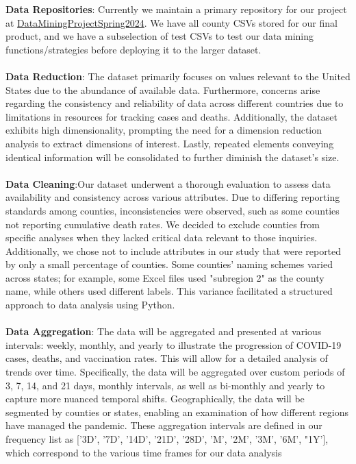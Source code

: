 \documentclass[sigconf,screen,nonacm]{acmart}
\begin{document}
\noindent
\textbf{Data Repositories}: Currently we maintain a primary repository for our project at \href{https://github.com/CCoakley6/DataMiningProjectSpring2024}{DataMiningProjectSpring2024}. We have all county CSVs stored for our final product, and we have a subselection of test CSVs to test our data mining functions/strategies before deploying it to the larger dataset.\\
\\
\textbf{Data Reduction}: The dataset primarily focuses on values relevant to the United States due to the abundance of available data. Furthermore, concerns arise regarding the consistency and reliability of data across different countries due to limitations in resources for tracking cases and deaths. Additionally, the dataset exhibits high dimensionality, prompting the need for a dimension reduction analysis to extract dimensions of interest. Lastly, repeated elements conveying identical information will be consolidated to further diminish the dataset's size.\\
\\
\textbf{Data Cleaning}:Our dataset underwent a thorough evaluation to assess data availability and consistency across various attributes. Due to differing reporting standards among counties, inconsistencies were observed, such as some counties not reporting cumulative death rates. We decided to exclude counties from specific analyses when they lacked critical data relevant to those inquiries. Additionally, we chose not to include attributes in our study that were reported by only a small percentage of counties. Some counties' naming schemes varied across states; for example, some Excel files used "subregion 2" as the county name, while others used different labels. This variance facilitated a structured approach to data analysis using Python. \\
\\
\textbf{Data Aggregation}: The data will be aggregated and presented at various intervals: weekly, monthly, and yearly to illustrate the progression of COVID-19 cases, deaths, and vaccination rates. This will allow for a detailed analysis of trends over time. Specifically, the data will be aggregated over custom periods of 3, 7, 14, and 21 days, monthly intervals, as well as bi-monthly and yearly to capture more nuanced temporal shifts. Geographically, the data will be segmented by counties or states, enabling an examination of how different regions have managed the pandemic. These aggregation intervals are defined in our frequency list as ['3D', '7D', '14D', '21D', '28D', 'M', '2M', '3M', '6M', "1Y'], which correspond to the various time frames for our data analysis\\ 
\end{document}
